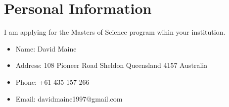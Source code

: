 \section{Personal Information}

I am applying for the Masters of Science program wihin your institution.

\begin{itemize}
    \item Name: David Maine
    \item Address: 108 Pioneer Road Sheldon Queensland 4157 Australia
    \item Phone: +61 435 157 266
    \item Email: davidmaine1997@gmail.com
\end{itemize}
